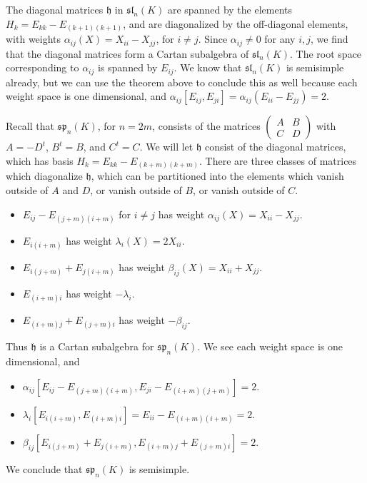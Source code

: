 \begin{example}
    The diagonal matrices $\mathfrak{h}$ in $\mathfrak{sl}_n(K)$ are spanned by the elements $H_k = E_{kk} - E_{(k+1)(k+1)}$, and are diagonalized by the off-diagonal elements, with weights $\alpha_{ij}(X) = X_{ii} - X_{jj}$, for $i \neq j$. Since $\alpha_{ij} \neq 0$ for any $i,j$, we find that the diagonal matrices form a Cartan subalgebra of $\mathfrak{sl}_n(K)$. The root space corresponding to $\alpha_{ij}$ is spanned by $E_{ij}$. We know that $\mathfrak{sl}_n(K)$ is semisimple already, but we can use the theorem above to conclude this as well because each weight space is one dimensional, and $\alpha_{ij}[E_{ij}, E_{ji}] = \alpha_{ij}(E_{ii} - E_{jj}) = 2$.
\end{example}

\begin{example}
    Recall that $\mathfrak{sp}_n(K)$, for $n = 2m$, consists of the matrices $\left( \begin{smallmatrix} A & B \\ C & D \end{smallmatrix} \right)$ with $A = -D^t$, $B^t = B$, and $C^t = C$. We will let $\mathfrak{h}$ consist of the diagonal matrices, which has basis $H_k = E_{kk} - E_{(k + m)(k+m)}$. There are three classes of matrices which diagonalize $\mathfrak{h}$, which can be partitioned into the elements which vanish outside of $A$ and $D$, or vanish outside of $B$, or vanish outside of $C$.
    \begin{itemize}
        \item $E_{ij} - E_{(j+m)(i+m)}$ for $i \neq j$ has weight $\alpha_{ij}(X) = X_{ii} - X_{jj}$.

        \item $E_{i(i+m)}$ has weight $\lambda_i(X) = 2 X_{ii}$.
        
        \item $E_{i(j+m)} + E_{j(i+m)}$ has weight $\beta_{ij}(X) = X_{ii} + X_{jj}$.

        \item $E_{(i+m)i}$ has weight $-\lambda_i$.

        \item $E_{(i+m)j} + E_{(j+m)i}$ has weight $-\beta_{ij}$.
    \end{itemize}
    Thus $\mathfrak{h}$ is a Cartan subalgebra for $\mathfrak{sp}_n(K)$. We see each weight space is one dimensional, and
    \begin{itemize}
        \item $\alpha_{ij} [E_{ij} - E_{(j+m)(i+m)}, E_{ji} - E_{(i+m)(j+m)}] = 2$.
        \item $\lambda_i [E_{i(i+m)}, E_{(i+m)i}] = E_{ii} - E_{(i+m)(i+m)} = 2$.
        \item $\beta_{ij}[E_{i(j+m)} + E_{j(i+m)}, E_{(i+m)j} + E_{(j+m)i}] = 2$.
    \end{itemize}
    We conclude that $\mathfrak{sp}_n(K)$ is semisimple.
\end{example}

